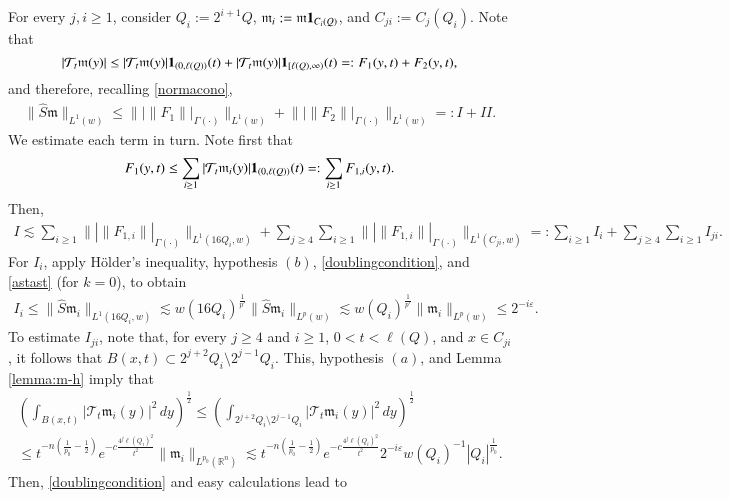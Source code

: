 \documentclass[11pt, a4paper,leqno]{amsart}
\newcommand{\mm}{\mathfrak{m}}
\renewcommand{\chi}{{\bf 1}}
\theoremstyle{plain}
\theoremstyle{definition}
\theoremstyle{remark}
\numberwithin{equation}{section}
\begin{document}
For every $j,i\geq 1$, consider $Q_i:=2^{i+1}Q$,  $\mm_i:=\mm\chi_{C_i(Q)}$, and $C_{ji}:=C_j(Q_i)$.
Note that
$$
|\mathcal{T}_t\mm(y)|\leq|\mathcal{T}_t\mm(y)|\chi_{(0,\ell(Q))}(t)+|\mathcal{T}_t\mm(y)|\chi_{[\ell(Q),\infty)}(t)=:F_1(y,t)+F_2(y,t),
$$
and therefore, recalling \eqref{normacono},
\begin{align*}
\|\widehat{S}\mm\|_{L^1(w)}
\leq
\big\||\|F_1\||_{\Gamma(\cdot)}\big\|_{L^1(w)}+\big\||\|F_
2\||_{\Gamma(\cdot)}\big\|_{L^1(w)}
 =: I+II.
\end{align*}
We estimate each term in turn. Note first that
$$
F_1(y,t)
\leq\sum_{i\geq 1}|\mathcal{T}_t\mm_i(y)|\chi_{(0,\ell(Q))}(t)=:\sum_{i\geq 1}F_{1,i}(y,t).
$$
Then,
\begin{align}\label{acotacionmol:I}
I\lesssim \sum_{i\geq 1}\big\||\|F_{1,i}\||_{\Gamma(\cdot)}\big\|_{L^1(16Q_i,w)}
+ \sum_{j\geq 4}\sum_{i\geq 1}\big\||\|F_{1,i}\||_{\Gamma(\cdot)}\big\|_{L^1(C_{ji},w)}
=:\sum_{i\geq 1}I_i + \sum_{j\geq 4}\sum_{i\geq 1}I_{ji}.
\end{align}
For $I_i$, apply H\"older's inequality, hypothesis $(b)$, \eqref{doublingcondition}, and \eqref{astast} (for $k=0$), to obtain
\begin{align}\label{Ii}
I_i
\le
\|\widehat{S}\mm_i\|_{L^1(16Q_i,w)}
\lesssim
w(16Q_i)^{\frac1{p'}}
\|\widehat{S}\mm_i\|_{L^p(w)}
\lesssim w(Q_i)^{\frac1{p'}} \|\mm_i\|_{L^p(w)}
\le 2^{-i\varepsilon}.
\end{align}
To estimate $I_{ji}$,  note that, for every $j\geq 4$ and $i\geq 1$, $0< t< \ell(Q)$, and $x\in C_{ji}$, it follows that
$
B(x,t)\subset 2^{j+2}Q_i\setminus 2^{j-1}Q_i.
$
This, hypothesis $(a)$, and Lemma \ref{lemma:m-h} imply that
\begin{multline*}
 \left(\int_{B(x,t)}|\mathcal{T}_t\mm_i(y)|^2\,dy\right)^{\frac{1}{2}}\leq
  \left(\int_{2^{j+2}Q_i\setminus 2^{j-1}Q_i}|\mathcal{T}_t\mm_i(y)|^2\,dy\right)^{\frac{1}{2}}
\\
\leq t^{-n\left(\frac{1}{p_0}-\frac{1}{2}\right)}e^{-c\frac{4^j\ell(Q_i)^2}{t^2}}
 \|\mm_i\|_{L^{p_0}(\mathbb{R}^n)}
 \lesssim
t^{-n\left(\frac{1}{p_0}-\frac{1}{2}\right)}e^{-c\frac{4^j\ell(Q_i)^2}{t^2}} 2^{-i\varepsilon}
w(Q_i)^{-1}|Q_i|^{\frac{1}{p_0}}.
\end{multline*}
Then,  \eqref{doublingcondition} and easy calculations lead to
\end{document}
